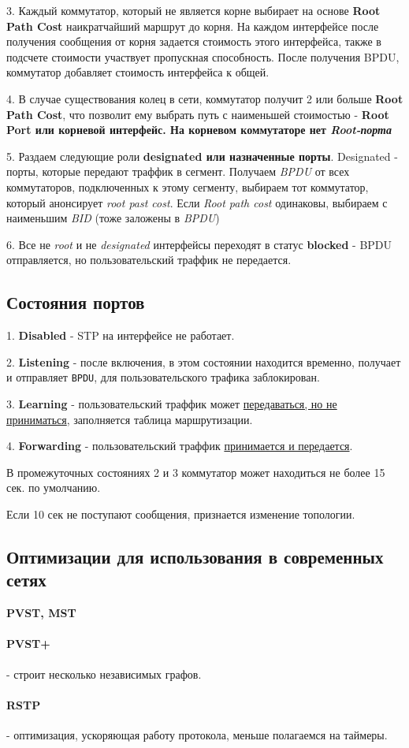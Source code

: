 \documentclass[a4paper,10pt]{article}
\begin{document}
	3. Каждый коммутатор, который не является корне выбирает на основе \textbf{Root Path Cost} наикратчайший маршрут до корня. На каждом интерфейсе после получения сообщения от корня задается стоимость этого интерфейса, также в подсчете стоимости участвует пропускная способность. После получения BPDU, коммутатор добавляет стоимость интерфейса к общей.
	
	4. В случае существования колец в сети, коммутатор получит 2 или больше \textbf{Root Path Cost}, что позволит ему выбрать путь с наименьшей стоимостью - \textbf{Root Port или корневой интерфейс. На корневом коммутаторе нет \emph{Root-порта}}
	
	5. Раздаем следующие роли \textbf{designated или назначенные порты}. Designated - порты, которые передают траффик в сегмент. Получаем \emph{BPDU} от всех коммутаторов, подключенных к этому сегменту, выбираем тот коммутатор, который анонсирует \emph{root past cost}. Если \emph{Root path cost} одинаковы, выбираем с наименьшим \emph{BID} (тоже заложены в \emph{BPDU})
	
	6. Все не \emph{root} и не \emph{designated} интерфейсы переходят в статус \textbf{blocked} - BPDU отправляется, но пользовательский траффик не передается.
	
	\subsection{Состояния портов}
	1. \textbf{Disabled} - STP на интерфейсе не работает.
	
	2. \textbf{Listening} - после включения, в этом состоянии находится временно, получает и отправляет \texttt{BPDU}, для пользовательского трафика заблокирован.
	
	3. \textbf{Learning} - пользовательский траффик может \underline{передаваться, но не приниматься}, заполняется таблица маршрутизации.
	
	4. \textbf{Forwarding} - пользовательский траффик \underline{принимается и передается}.
	
	В промежуточных состояниях 2 и 3 коммутатор может находиться не более 15 сек. по умолчанию.
	
	Если 10 сек не поступают сообщения, признается изменение топологии.
	
	\subsection{Оптимизации для использования в современных сетях}
	\textbf{PVST, MST}
	\paragraph{PVST+} - строит несколько независимых графов.
	\paragraph{RSTP} - оптимизация, ускоряющая работу протокола, меньше полагаемся на таймеры.
\end{document}
